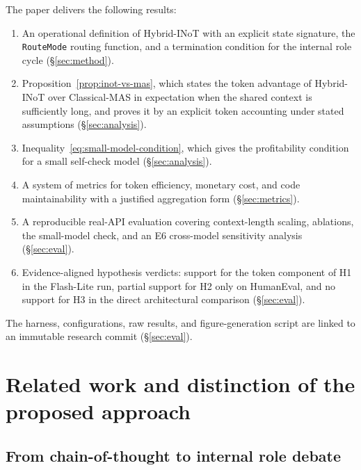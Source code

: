 The paper delivers the following results:
\begin{enumerate}
\item[\textbf{C1.}] An operational definition of Hybrid-INoT with an explicit state signature, the \textnormal{\texttt{RouteMode}} routing function, and a termination condition for the internal role cycle (§\ref{sec:method}).
\item[\textbf{C2.}] Proposition~\ref{prop:inot-vs-mas}, which states the token advantage of Hybrid-INoT over Classical-MAS in expectation when the shared context is sufficiently long, and proves it by an explicit token accounting under stated assumptions (§\ref{sec:analysis}).
\item[\textbf{C3.}] Inequality~\eqref{eq:small-model-condition}, which gives the profitability condition for a small self-check model (§\ref{sec:analysis}).
\item[\textbf{C4.}] A system of metrics for token efficiency, monetary cost, and code maintainability with a justified aggregation form (§\ref{sec:metrics}).
\item[\textbf{C5.}] A reproducible real-API evaluation covering context-length scaling, ablations, the small-model check, and an E6 cross-model sensitivity analysis (§\ref{sec:eval}).
\item[\textbf{C6.}] Evidence-aligned hypothesis verdicts: support for the token component of H1 in the Flash-Lite run, partial support for H2 only on HumanEval, and no support for H3 in the direct architectural comparison (§\ref{sec:eval}).
\end{enumerate}

\noindent The harness, configurations, raw results, and figure-generation script are linked to an immutable research commit (§\ref{sec:eval}).

\section{Related work and distinction of the proposed approach}\label{sec:related}

\subsection{From chain-of-thought to internal role debate}

